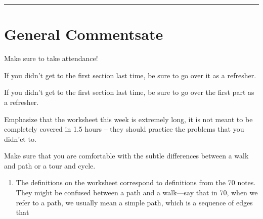 \documentclass{exam}
\title{}
\date{Graphs, Trees, Hypercubes}
\begin{document}
\maketitle
\rule{\textwidth}{0.15em}
\fontsize{12}{15}\selectfont
\thispagestyle{empty}


\section{General Commentsate}
\item Make sure to take attendance!
\item If you didn't get to the first section last time, be sure to go over it as a refresher.
\item If you didn't get to the first section last time, be sure to go over the first part as a refresher.
\item Emphasize that the worksheet this week is extremely long, it is not meant to be completely covered in 1.5 hours -- they should practice the problems that you didn’et to.
\item Make sure that you are comfortable with the subtle differences between a walk and path or a tour and cycle. 
\begin{enumerate}
	\item The definitions on the worksheet correspond to definitions from the 70 notes. They might be confused between a path and a walk---say that in 70, when we refer to a path, we usually mean a simple path, which is a sequence of edges that 
\end{enumerate}
\end{document}
